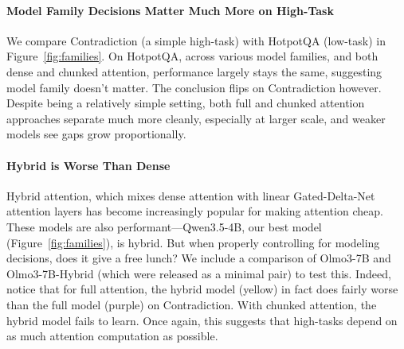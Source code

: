 \paragraph{Model Family Decisions Matter Much More on High-\cname Task} We compare Contradiction (a simple high-\cname task) with HotpotQA (low-\cname task) in Figure~\ref{fig:families}. On HotpotQA, across various model families, and both dense and chunked attention, performance largely stays the same, suggesting model family doesn't matter.  The conclusion flips on Contradiction however. Despite being a relatively simple setting, both full and chunked attention approaches separate much more cleanly, especially at larger scale, and weaker models see gaps grow proportionally. 

\paragraph{Hybrid is Worse Than Dense} Hybrid attention, which mixes dense attention with linear Gated-Delta-Net attention layers has become increasingly popular for making attention cheap. These models are also performant---Qwen3.5-4B, our best model (Figure~\ref{fig:families}), is hybrid. But when properly controlling for modeling decisions, does it give a free lunch? We include a comparison of Olmo3-7B and Olmo3-7B-Hybrid (which were released as a minimal pair) to test this. Indeed, notice that for full attention, the hybrid model (yellow) in fact does fairly worse than the full model (purple) on Contradiction.  With chunked attention, the hybrid model fails to learn.  Once again, this suggests that high-\cname tasks depend on as much attention computation as possible. 



